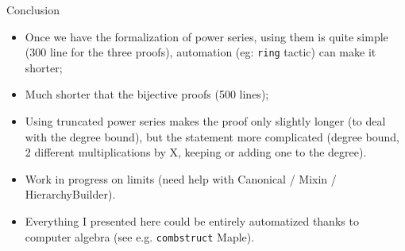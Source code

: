 \documentclass[compress,11pt]{beamer}
\begin{document}
\begin{frame}{Conclusion}

  \begin{itemize}
  \item Once we have the formalization of power series, using them is quite
    simple (300 line for the three proofs), automation (eg: \texttt{ring}
    tactic) can make it shorter;
  \item Much shorter that the bijective proofs (500 lines);
  \item Using truncated power series makes the proof only slightly longer (to
    deal with the degree bound), but the statement more complicated (degree
    bound, 2 different multiplications by X, keeping or adding one to the
    degree).
  \item Work in progress on limits (need help with
    Canonical / Mixin / HierarchyBuilder).
  \item Everything I presented here could be entirely automatized thanks to
    computer algebra (see e.g. \texttt{combstruct} Maple\textcopyright).
  \end{itemize}
\end{frame}
\end{document}
